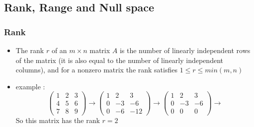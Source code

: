 \documentclass{beamer}
\begin{document}
\subsection{Rank, Range and Null space}
\begin{frame}
	\frametitle{Rank}
         \begin{itemize}
\item The rank $r$ of an $ m \times n $  matrix $A$ is the number of linearly independent rows of
the matrix (it is also equal to the number of linearly independent columns), and
			 for a nonzero matrix the rank satisfies $ 1 \leq r \leq min(m,n) $
		 \pause
		 \item example : 
	 $$
		 \begin{pmatrix} 1 & 2 & 3 \\ 4 & 5 & 6 \\ 7 & 8 & 9 \end{pmatrix}  
				 \rightarrow
\begin{pmatrix} 1 & 2 & 3 \\ 0 & -3 & -6 \\ 0 & -6 & -12 \end{pmatrix}  
				 \rightarrow
\begin{pmatrix} 1 & 2 & 3 \\ 0 & -3 & -6 \\ 0 & 0 & 0 \end{pmatrix}  
				 \rightarrow $$
		 \pause
				 So this matrix has the rank $r = 2$


	 \end{itemize}
\end{frame}
\end{document}
